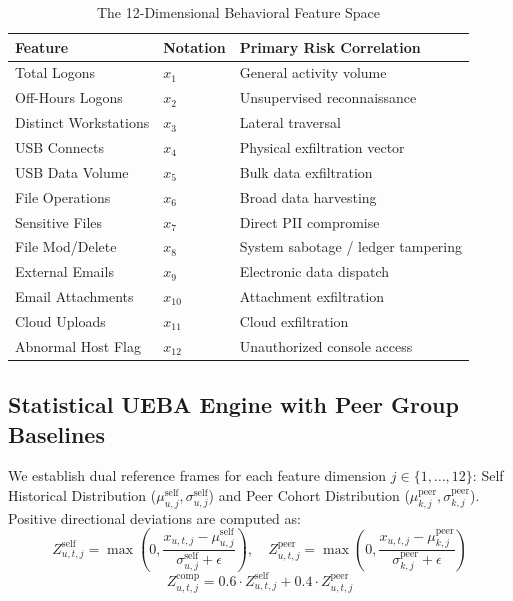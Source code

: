 \documentclass[conference]{IEEEtran}
\begin{document}
\begin{table}[htbp]
\caption{The 12-Dimensional Behavioral Feature Space}
\begin{center}
\begin{tabular}{lll}
\toprule
\textbf{Feature} & \textbf{Notation} & \textbf{Primary Risk Correlation} \\
\midrule
Total Logons & $x_1$ & General activity volume \\
Off-Hours Logons & $x_2$ & Unsupervised reconnaissance \\
Distinct Workstations & $x_3$ & Lateral traversal \\
USB Connects & $x_4$ & Physical exfiltration vector \\
USB Data Volume & $x_5$ & Bulk data exfiltration \\
File Operations & $x_6$ & Broad data harvesting \\
Sensitive Files & $x_7$ & Direct PII compromise \\
File Mod/Delete & $x_8$ & System sabotage / ledger tampering \\
External Emails & $x_9$ & Electronic data dispatch \\
Email Attachments & $x_{10}$ & Attachment exfiltration \\
Cloud Uploads & $x_{11}$ & Cloud exfiltration \\
Abnormal Host Flag & $x_{12}$ & Unauthorized console access \\
\bottomrule
\end{tabular}
\end{center}
\label{tab:features}
\end{table}

\subsection{Statistical UEBA Engine with Peer Group Baselines}
We establish dual reference frames for each feature dimension $j \in \{1, \dots, 12\}$:
Self Historical Distribution ($\mu_{u, j}^{\text{self}}, \sigma_{u, j}^{\text{self}}$) and Peer Cohort Distribution ($\mu_{k, j}^{\text{peer}}, \sigma_{k, j}^{\text{peer}}$). Positive directional deviations are computed as:
\begin{equation}
Z_{u, t, j}^{\text{self}} = \max\left(0, \frac{x_{u, t, j} - \mu_{u, j}^{\text{self}}}{\sigma_{u, j}^{\text{self}} + \epsilon}\right), \quad Z_{u, t, j}^{\text{peer}} = \max\left(0, \frac{x_{u, t, j} - \mu_{k, j}^{\text{peer}}}{\sigma_{k, j}^{\text{peer}} + \epsilon}\right)
\end{equation}
\begin{equation}
Z_{u, t, j}^{\text{comp}} = 0.6 \cdot Z_{u, t, j}^{\text{self}} + 0.4 \cdot Z_{u, t, j}^{\text{peer}}
\end{equation}
\end{document}
